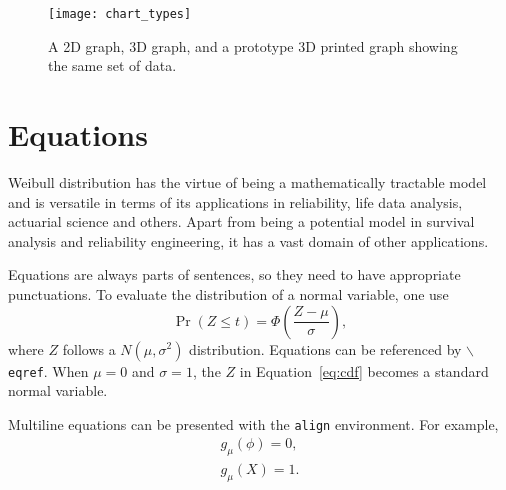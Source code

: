 \documentclass[letterpaper, inpress]{jds} %
\begin{document}
\begin{figure}[ht]
  \begin{center}
  \centerline{\texttt{[image: chart\_types]}}
  \caption{A 2D graph, 3D graph, and a prototype 3D printed graph showing the same set of data.}
  \label{chartcomparison}
  \end{center}
  \end{figure}


































\section{Equations}%
\label{sec:eq}


Weibull distribution has the virtue of being a mathematically tractable model
and is versatile in terms of its applications in reliability, life data
analysis, actuarial science and others. Apart from being a potential model in
survival analysis and reliability engineering, it has a vast domain of other
applications.

Equations are always parts of sentences, so they need to have
appropriate punctuations. To evaluate the distribution of a normal
variable, one use
\begin{equation}
  \label{eq:cdf}
  \Pr(Z \le t) = \Phi\left(\frac{Z - \mu}{\sigma} \right),
\end{equation}
where $Z$ follows a $N(\mu, \sigma^2)$ distribution.
Equations can be referenced by \texttt{$\backslash$eqref}.
When $\mu = 0$ and $\sigma = 1$, the $Z$ in Equation~\eqref{eq:cdf}
becomes a standard normal variable.


Multiline equations can be presented with the \texttt{align}
environment. For example,
\begin{align*}
  g_{\mu}(\phi) = 0,\\
  g_{\mu}(X) = 1.
\end{align*}
\end{document}
